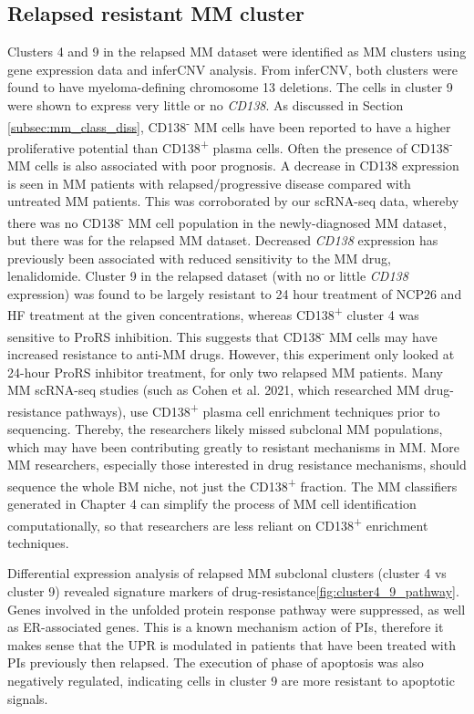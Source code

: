 \subsection{Relapsed resistant MM cluster}
Clusters 4 and 9 in the relapsed MM dataset were identified as MM clusters using gene expression data and inferCNV analysis.
From inferCNV, both clusters were found to have myeloma-defining chromosome 13 deletions.
The cells in cluster 9 were shown to express very little or no \textit{CD138}.
As discussed in Section \ref{subsec:mm_class_diss}, CD138\textsuperscript{-} MM cells have been reported to have a higher proliferative potential than CD138\textsuperscript{+} plasma cells.
Often the presence of CD138\textsuperscript{-} MM cells is also associated with poor prognosis.
A decrease in CD138 expression is seen in MM patients with relapsed/progressive disease compared with untreated MM patients\cite{kawano2012multiple}.
This was corroborated by our scRNA-seq data, whereby there was no CD138\textsuperscript{-} MM cell population in the newly-diagnosed MM dataset, but there was for the relapsed MM dataset.
Decreased \textit{CD138} expression has previously been associated with reduced sensitivity to the MM drug, lenalidomide\cite{kawano2012multiple}.
Cluster 9 in the relapsed dataset (with no or little \textit{CD138} expression) was found to be largely resistant to 24 hour treatment of NCP26 and HF treatment at the given concentrations, whereas CD138\textsuperscript{+} cluster 4 was sensitive to ProRS inhibition.
This suggests that CD138\textsuperscript{-} MM cells may have increased resistance to anti-MM drugs.
However, this experiment only looked at 24-hour ProRS inhibitor treatment, for only two relapsed MM patients.
Many MM scRNA-seq studies (such as Cohen et al. 2021, which researched MM drug-resistance pathways\cite{cohen2021identification}), use CD138\textsuperscript{+} plasma cell enrichment techniques prior to sequencing.
Thereby, the researchers likely missed subclonal MM populations, which may have been contributing greatly to resistant mechanisms in MM\@.
More MM researchers, especially those interested in drug resistance mechanisms, should sequence the whole BM niche, not just the CD138\textsuperscript{+} fraction.
The MM classifiers generated in Chapter 4 can simplify the process of MM cell identification computationally, so that researchers are less reliant on CD138\textsuperscript{+} enrichment techniques.

Differential expression analysis of relapsed MM subclonal clusters (cluster 4 vs cluster 9) revealed signature markers of drug-resistance\ref{fig:cluster4_9_pathway}.
Genes involved in the unfolded protein response pathway were suppressed, as well as ER-associated genes.
This is a known mechanism action of PIs, therefore it makes sense that the UPR is modulated in patients that have been treated with PIs previously then relapsed.
The execution of phase of apoptosis was also negatively regulated, indicating cells in cluster 9 are more resistant to apoptotic signals.

